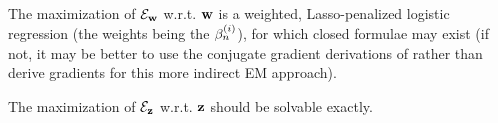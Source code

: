 \documentclass{article}
\begin{document}
The maximization of ${\cal E}_{{\bf w}}$ w.r.t. ${\bf w}$ is a weighted, Lasso-penalized logistic regression
(the weights being the $\beta^{(i)}_{n}$),
for which closed formulae may exist (if not, it may be better to use the conjugate gradient derivations
of \cite{BootkrajangKaban2012} rather than derive gradients for this more indirect EM approach).

The maximization of ${\cal E}_{{\bf z}}$ w.r.t. ${\bf z}$ should be solvable exactly.




\end{document}

